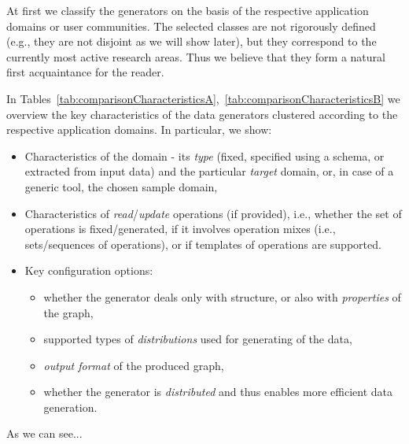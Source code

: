 %


At first we classify the generators on the basis of the respective application domains or user communities. The selected classes are not rigorously defined (e.g., they are not disjoint as we will show later), but they correspond to the currently most active research areas. Thus we believe that they form a natural first acquaintance for the reader.

In Tables~\ref{tab:comparisonCharacteristicsA},~\ref{tab:comparisonCharacteristicsB}   we overview the key characteristics of the data generators clustered according to the respective application domains. In particular, we show:

\begin{itemize}
\item Characteristics of the domain - its \textit{type} (fixed, specified using a schema, or extracted from input data) and the particular \textit{target} domain, or, in case of a generic tool, the chosen sample domain,
\item Characteristics of \textit{read}/\textit{update} operations (if provided), i.e., whether the set of operations is fixed/generated, if it involves operation mixes (i.e., sets/sequences of operations), or if templates of operations are supported.
\item Key configuration options:
  \begin{itemize}
    \item whether the generator deals only with structure, or also with \textit{properties} of the graph,
    \item supported types of \textit{distributions} used for generating of the data,
    \item \textit{output format} of the produced graph,
    \item  whether the generator is \textit{distributed} and thus enables more efficient data generation.
  \end{itemize}
\end{itemize}

As we can see...

